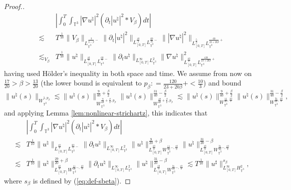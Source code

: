 \begin{proof}[Proof.]
\begin{eqnarray*}
    &&\left| \int^T_0 \int_{\mathbb{T}^3} | \nabla u^{\natural} |^2 (\partial_t
    | u^{\natural} |^2 \ast V_{\beta}) d t \right| \\
    & \lesssim &
    T^{\frac{1}{10}} \| V_{\beta} \|_{L^{\frac{3}{3 - \beta}
    -}_{\mathbb{T}^3}} \| \partial_t | u^{\natural} |^2 \|_{L_{[0,
    T]}^{\frac{10}{3}} L_{\mathbb{T}^3}^{\frac{60}{37} -}} \| | \nabla
    u^{\natural} |^2 \|_{L^{\frac{5}{3}}_{[0, T]} L^{\frac{60}{23 + 20 \beta}
    +}_{\mathbb{T}^3}}\\
    & \lesssim_{V_{\beta}} & T^{\frac{1}{10}} \| u^{\natural}
    \|_{L^{\frac{10}{3}}_{[0, T]} L_{\mathbb{T}^3}^{\frac{60}{7} -}} \|
    \partial_t u^{\natural} \|_{L^{\infty}_{[0, T]} L_{\mathbb{T}^3}^2} \|
    \nabla u^{\natural} \|^2_{L^{\frac{10}{3}}_{[0, T]} L^{\frac{120}{23 + 20
    \beta} +}_{\mathbb{T}^3}}
  \end{eqnarray*}
  having used H{\"o}lder's inequality in both space and time. We assume from now on $\frac{17}{20} > \beta > \frac{13}{20}$ (the lower
  bound is equivalent to $p_{\beta} : = \frac{120}{23 + 20 \beta} + <
  \frac{10}{3}$) and bound
  \[ \| u^{\natural} (s) \|_{W^{1, p_{\beta}}_{\mathbb{T}^3}} \lesssim \|
     u^{\natural} (s) \|^{\frac{9}{40} + \frac{\beta}{2}}_{W^{\frac{9}{40} +
     \frac{\beta}{2}, p_{\beta}}_{\mathbb{T}^3}} \| u^{\natural} (s)
     \|^{\frac{31}{40} - \frac{\beta}{2}}_{W^{\frac{49}{40} + \frac{\beta}{2},
     p_{\beta}}_{\mathbb{T}^3}} \lesssim \| u^{\natural} (s) \|^{\frac{9}{40}
     + \frac{\beta}{2}}_{W^{\frac{11}{20}, \frac{10}{3}}_{\mathbb{T}^3}} \|
     u^{\natural} (s) \|^{\frac{31}{40} - \frac{\beta}{2}}_{W^{\frac{31}{20},
     \frac{10}{3}}_{\mathbb{T}^3}}, \]
  and applying Lemma \ref{lem:nonlinear-strichartz}, this indicates that
  \begin{eqnarray*}
    &&\left| \int^T_0 \int_{\mathbb{T}^3} | \nabla u^{\natural} |^2 (\partial_t
    | u^{\natural} |^2 \ast V_{\beta}) d t \right|\\ 
    & \lesssim &
    T^{\frac{1}{10}} \| u^{\natural} \|_{L^{\frac{10}{3}}_{[0, T]}
    L_{\mathbb{T}^3}^{\frac{60}{7} -}} \| \partial_t u^{\natural}
    \|_{L^{\infty}_{[0, T]} L_{\mathbb{T}^3}^2} \| u^{\natural}
    \|^{\frac{9}{20} + \beta}_{L_{[0, T]}^{\frac{10}{3}} W^{\frac{11}{20} -,
    \frac{10}{3}}_{\mathbb{T}^3}} \| u^{\natural} \|^{\frac{31}{20} -
    \beta}_{L_{[0, T]}^{\frac{10}{3}} W^{\frac{31}{20} -,
    \frac{10}{3}}_{\mathbb{T}^3}}\\
    & \lesssim & T^{\frac{1}{10}} \| u^{\natural} \|^{\frac{29}{20} +
    \beta}_{L_{[0, T]}^{\frac{10}{3}} W^{\frac{11}{20} -,
    \frac{10}{3}}_{\mathbb{T}^3}} \| \partial_t u^{\natural}
    \|_{L^{\infty}_{[0, T]} L_{\mathbb{T}^3}^2} \| u^{\natural}
    \|^{\frac{31}{20} - \beta}_{L_{[0, T]}^{\frac{10}{3}} W^{\frac{31}{20} -,
    \frac{10}{3}}_{\mathbb{T}^3}} \lesssim T^{\frac{1}{10}} \| u^{\sharp}
    \|^{s_{\beta}}_{L_{[0, T]}^{\infty} H_{\mathbb{T}^3}^2},
  \end{eqnarray*}
  where $s_{\beta}$ is defined by (\ref{eq:def-sbeta}). 
\end{proof}

